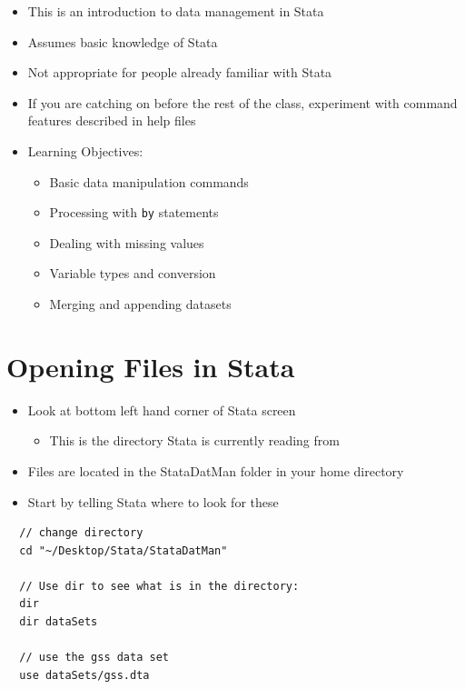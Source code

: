 \documentclass[]{book}
\providecommand{\tightlist}{%
  \setlength{\itemsep}{0pt}\setlength{\parskip}{0pt}}
\begin{document}
\begin{itemize}
\tightlist
\item
  This is an introduction to data management in Stata
\item
  Assumes basic knowledge of Stata
\item
  Not appropriate for people already familiar with Stata
\item
  If you are catching on before the rest of the class, experiment with
  command features described in help files
\item
  Learning Objectives:

  \begin{itemize}
  \tightlist
  \item
    Basic data manipulation commands
  \item
    Processing with \texttt{by} statements
  \item
    Dealing with missing values
  \item
    Variable types and conversion
  \item
    Merging and appending datasets
  \end{itemize}
\end{itemize}

\section{Opening Files in Stata}\label{opening-files-in-stata}

\begin{itemize}
\tightlist
\item
  Look at bottom left hand corner of Stata screen

  \begin{itemize}
  \tightlist
  \item
    This is the directory Stata is currently reading from
  \end{itemize}
\item
  Files are located in the StataDatMan folder in your home directory
\item
  Start by telling Stata where to look for these
\end{itemize}

\begin{verbatim}
  // change directory
  cd "~/Desktop/Stata/StataDatMan"

  // Use dir to see what is in the directory:
  dir
  dir dataSets

  // use the gss data set
  use dataSets/gss.dta
\end{verbatim}
\end{document}
